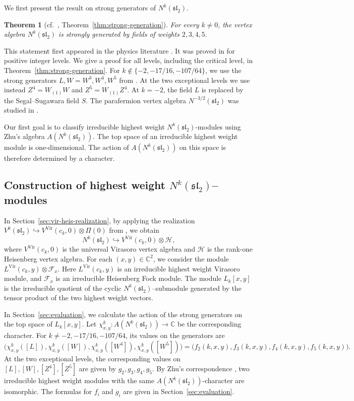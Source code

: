 \documentclass[11 pt]{amsart}
\newtheorem{theorem}{Theorem}
\theoremstyle{definition}
\theoremstyle{plain}
\newcommand{\Vir}{\mathrm{Vir}}
\begin{document}
We first present the  result on strong generators of $N^k(\mathfrak{sl}_2)$.

\begin{theorem}[cf.\ \cite{DLWY}, Theorem~\ref{thm:strong-generation}]
\label{thm:strong-generation-uvod}
For every $k\neq0$, the vertex algebra $N^k(\mathfrak{sl}_2)$ is strongly
generated by fields of weights $2,3,4,5$.
\end{theorem}

This statement first appeared in the physics literature \cite{BEHHH}.
It was proved in \cite{DLWY} for positive integer levels. We give a proof
for all levels, including the critical level, in
Theorem~\ref{thm:strong-generation}. For
$k\notin\{-2,-17/16,-107/64\}$, we use the strong generators
$L,W=W^3,W^4,W^5$ from \cite{BEHHH,DLY}. At the two exceptional
levels we use instead $Z^4=W_{(1)}W$ and $Z^5=W_{(1)}Z^4$.
At $k=-2$, the field $L$ is replaced by the Segal--Sugawara field
$S$. The parafermion vertex algebra $N^{-3/2}(\mathfrak{sl}_2)$ was studied in \cite{AMW}.

Our first goal is to classify irreducible highest weight
$N^k(\mathfrak{sl}_2)$-modules using Zhu's algebra
$A(N^k(\mathfrak{sl}_2))$. The top space of
an irreducible highest weight module is one-dimensional. The action of
$A(N^k(\mathfrak{sl}_2))$ on this space is therefore determined by a
character.

\subsection*{Construction of highest weight $N^k(\mathfrak{sl}_2)$--modules}
In Section~\ref{sec:vir-heis-realization}, by applying the realization $V^k(\mathfrak{sl}_2)\hookrightarrow
V^{\Vir}(c_k,0)\otimes  \Pi(0)$
from \cite{A2019}, we obtain
\[
N^k(\mathfrak{sl}_2)\hookrightarrow
V^{\Vir}(c_k,0)\otimes\mathcal H,
\]
where $V^{\Vir}(c_k,0)$ is the universal Virasoro vertex algebra and
$\mathcal H$ is the rank-one Heisenberg vertex algebra.  For each
$(x,y)\in\mathbb C^2$, we consider the module
$L^{\Vir}(c_k,y)\otimes\mathcal F_x$.
Here $L^{\Vir}(c_k,y)$ is an irreducible highest weight Virasoro module,
and $\mathcal F_x$ is an irreducible Heisenberg Fock module.  The module
$L_k[x,y]$ is the irreducible quotient of the cyclic
$N^k(\mathfrak{sl}_2)$--submodule generated by the tensor product of
the two highest weight vectors.

In Section~\ref{sec:evaluation}, we calculate the action of the strong
generators on the top space of $L_k[x,y]$.  Let
$\chi^k_{x,y}:A(N^k(\mathfrak{sl}_2))\to\mathbb C$ be the corresponding
character. For
$k\neq-2,-17/16,-107/64$, its values on the generators are
\[
\bigl(\chi^k_{x,y}([L]),\chi^k_{x,y}([W]),
\chi^k_{x,y}([W^4]),\chi^k_{x,y}([W^5])\bigr)
=
\bigl(f_2(k,x,y),f_3(k,x,y),f_4(k,x,y),f_5(k,x,y)\bigr).
\]
At the two exceptional levels, the corresponding values on
$[L],[W],[Z^4],[Z^5]$ are given by $g_2,g_3,g_4,g_5$.
By Zhu's correspondence \cite{FZ,Zhu}, two irreducible highest weight
modules with the same $A(N^k(\mathfrak{sl}_2))$-character are
isomorphic. The
formulas for $f_i$ and $g_i$ are given in
Section~\ref{sec:evaluation}.
\end{document}
